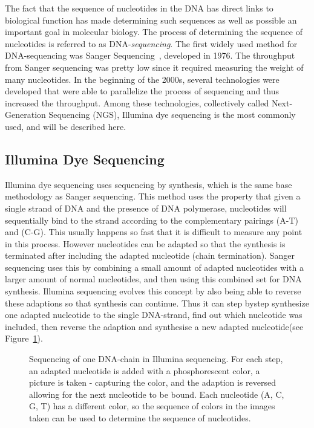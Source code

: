 The fact that the sequence of nucleotides in the DNA has direct links to biological function has made determining such sequences as well as possible an important goal in molecular biology.
The process of determining the sequence of nucleotides is referred to as DNA-\emph{sequencing}.
The first widely used method for DNA-sequencing was Sanger Sequencing~\cite{sanger}, developed in 1976.
The throughput from Sanger sequencing was pretty low since it required measuring the weight of many nucleotides.
In the beginning of the 2000s, several technologies were developed that were able to parallelize the process of sequencing and thus increased the throughput. Among these technologies,  collectively called Next-Generation Sequencing (NGS), Illumina dye sequencing is the most commonly used, and will be described here.

\subsection{Illumina Dye Sequencing}
Illumina dye sequencing uses sequencing by synthesis, which is the same base methodology as Sanger sequencing. 
This method uses the property that given a single strand of DNA and the presence of DNA polymerase, nucleotides will sequentially bind to the strand according to the complementary pairings (A-T) and (C-G).
This usually happens so fast that it is difficult to measure any point in this process.
However nucleotides can be adapted so that the synthesis is terminated after including the adapted nucleotide (chain termination).
Sanger sequencing uses this by combining a small amount of adapted nucleotides with a larger amount of normal nucleotides, and then using this combined set for DNA synthesis.
Illumina sequencing evolves this concept by also being able to reverse these adaptions so that synthesis can continue. Thus it can step bystep synthesize one adapted nucleotide to the single DNA-strand, find out which nucleotide was included, then reverse the adaption and synthesise a new adapted nucleotide(see Figure~\ref{fig:illumina}).
\begin{figure}
  \tikzpicture
  
  \endtikzpicture
  \caption{Sequencing of one DNA-chain in Illumina sequencing. For each step, an adapted nucleotide is added with a phosphorescent color, a picture is taken - capturing the color, and the adaption is reversed allowing for the next nucleotide to be bound. Each nucleotide (A, C, G, T) has a different color, so the sequence of colors in the images taken can be used to determine the sequence of nucleotides.}
  \label{fig:illumina}
\end{figure}

